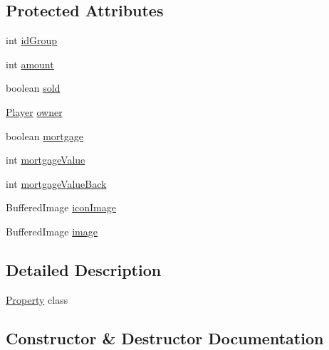 \subsection*{Protected Attributes}
\begin{DoxyCompactItemize}
\item 
int \hyperlink{class_monopoly_1_1_logic_1_1_property_ab42a31cd99e909728aa49c0184f644b8}{id\+Group}
\item 
int \hyperlink{class_monopoly_1_1_logic_1_1_property_a3e5525c94c56e900372c5a13a8fe03fb}{amount}
\item 
boolean \hyperlink{class_monopoly_1_1_logic_1_1_property_a3a3b93ad91c78c5fc0ffd6f5bfbdad1b}{sold}
\item 
\hyperlink{class_monopoly_1_1_logic_1_1_player}{Player} \hyperlink{class_monopoly_1_1_logic_1_1_property_a9f3128c7bd27dcebe1b58227124e87ff}{owner}
\item 
boolean \hyperlink{class_monopoly_1_1_logic_1_1_property_acedac56746517571ae6b1a1f2664bae8}{mortgage}
\item 
int \hyperlink{class_monopoly_1_1_logic_1_1_property_ae4b874ede5de05f1f5b0ab329c2c58f5}{mortgage\+Value}
\item 
int \hyperlink{class_monopoly_1_1_logic_1_1_property_a55c335444620ceab613d4e89c81e1eff}{mortgage\+Value\+Back}
\item 
Buffered\+Image \hyperlink{class_monopoly_1_1_logic_1_1_property_ab0fae1c569e5e37a15d099364b86a6bf}{icon\+Image}
\item 
Buffered\+Image \hyperlink{class_monopoly_1_1_logic_1_1_property_a1bd3d29f02147192157c57535fd0eca9}{image}
\end{DoxyCompactItemize}


\subsection{Detailed Description}
\hyperlink{class_monopoly_1_1_logic_1_1_property}{Property} class 

\subsection{Constructor \& Destructor Documentation}
